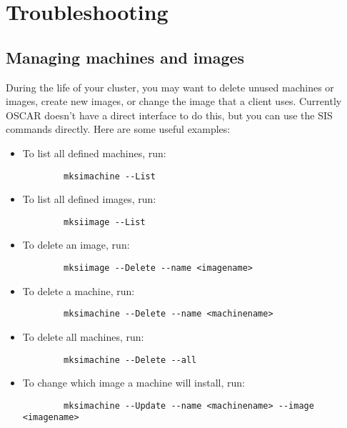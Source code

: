 %
%
%

\section{Troubleshooting}
\label{app:troubleshooting}


\subsection{Managing machines and images}
\label{app:troubleshooting-machines-images}

During the life of your cluster, you may want to delete unused
machines or images, create new images, or change the image that a
client uses.  Currently OSCAR doesn't have a direct interface to do
this, but you can use the SIS commands directly. Here are some useful
examples:

\begin{itemize}
\item To list all defined machines, run:
\begin{verbatim}
        mksimachine --List
\end{verbatim}
\item To list all defined images, run:
\begin{verbatim}
        mksiimage --List
\end{verbatim}
\item To delete an image, run:
\begin{verbatim}
        mksiimage --Delete --name <imagename>
\end{verbatim}
\item To delete a machine, run:
\begin{verbatim}
        mksimachine --Delete --name <machinename>
\end{verbatim}
\item To delete all machines, run:
\begin{verbatim}
        mksimachine --Delete --all
\end{verbatim}
\item To change which image a machine will install, run:
\begin{verbatim}
        mksimachine --Update --name <machinename> --image <imagename>
\end{verbatim}
\end{itemize}

